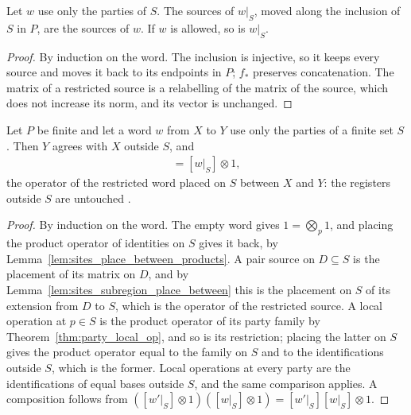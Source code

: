 \begin{theorem}
    \label{thm:party_restrict_sources}
    \leanok
    Let $w$ use only the parties of $S$. The sources of $w|_S$, moved along the
    inclusion of $S$ in $P$, are the sources of $w$. If $w$ is allowed, so is $w|_S$.
\end{theorem}
\begin{proof}\leanok
    By induction on the word. The inclusion is injective, so it keeps every source and
    moves it back to its endpoints in $P$; $f_*$ preserves concatenation. The matrix of
    a restricted source is a relabelling of the matrix of the source, which does not
    increase its norm, and its vector is unchanged.
\end{proof}

\begin{theorem}
    \label{thm:party_op_restrict}
    \leanok
    Let $P$ be finite and let a word $w$ from $X$ to $Y$ use only the parties of a
    finite set $S$. Then $Y$ agrees with $X$ outside $S$, and
    \begin{align}
        [w]=[w|_S]\otimes1,
        \label{eq:party_op_restrict}
    \end{align}
    the operator of the restricted word placed on $S$ between $X$ and $Y$: the
    registers outside $S$ are untouched \cite[Section~5.1]{OpenAI2026PolynomialPEPS}.
\end{theorem}
\begin{proof}\leanok
    By induction on the word. The empty word gives $1=\bigotimes_p1$, and placing the
    product operator of identities on $S$ gives it back, by
    Lemma~\ref{lem:sites_place_between_products}. A pair source on $D\subseteq S$ is
    the placement of its matrix on $D$, and by
    Lemma~\ref{lem:sites_subregion_place_between} this is the placement on $S$ of its
    extension from $D$ to $S$, which is the operator of the restricted source. A local
    operation at $p\in S$ is the product operator of its party family by
    Theorem~\ref{thm:party_local_op}, and so is its restriction; placing the latter on
    $S$ gives the product operator equal to the family on $S$ and to the
    identifications outside $S$, which is the former. Local operations at every party
    are the identifications of equal bases outside $S$, and the same comparison
    applies. A composition follows from
    $([w'|_S]\otimes1)([w|_S]\otimes1)=[w'|_S][w|_S]\otimes1$.
\end{proof}


